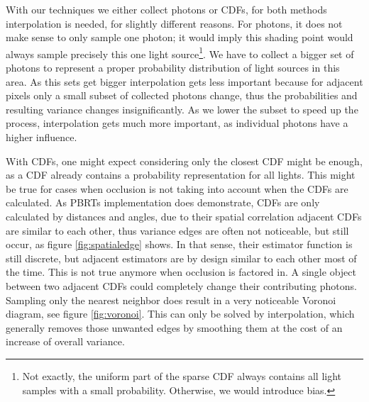 %    

With our techniques we either collect photons or CDFs, for both methods interpolation is needed, for slightly different reasons. For photons, it does not make sense to only sample one photon; it would imply this shading point would always sample precisely this one light source\footnote{Not exactly, the uniform part of the sparse CDF always contains all light samples with a small probability. Otherwise, we would introduce bias.}. We have to collect a bigger set of photons to represent a proper probability distribution of light sources in this area. As this sets get bigger interpolation gets less important because for adjacent pixels only a small subset of collected photons change, thus the probabilities and resulting variance changes insignificantly. As we lower the subset to speed up the process, interpolation gets much more important, as individual photons have a higher influence.

With CDFs, one might expect considering only the closest CDF might be enough, as a CDF already contains a probability representation for all lights. This might be true for cases when occlusion is not taking into account when the CDFs are calculated. As PBRTs implementation does demonstrate, CDFs are only calculated by distances and angles, due to their spatial correlation adjacent CDFs are similar to each other, thus variance edges are often not noticeable, but still occur, as figure \ref{fig:spatialedge} shows. In that sense, their estimator function is still discrete, but adjacent estimators are by design similar to each other most of the time. This is not true anymore when occlusion is factored in. A single object between two adjacent CDFs could completely change their contributing photons. Sampling only the nearest neighbor does result in a very noticeable Voronoi diagram, see figure \ref{fig:voronoi}. This can only be solved by interpolation, which generally removes those unwanted edges by smoothing them at the cost of an increase of overall variance.


